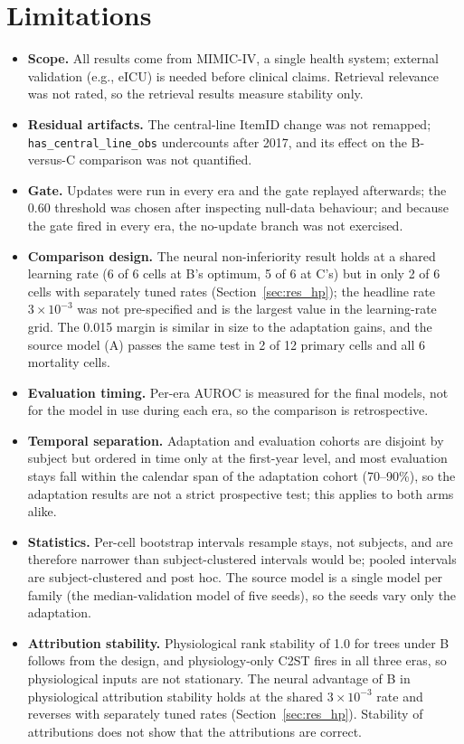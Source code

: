 \documentclass[10pt,a4paper,twocolumn]{article}
\begin{document}
	\section{Limitations}
	\label{sec:limitations}
	\begin{itemize}\setlength{\itemsep}{2pt}
		\item \textbf{Scope.} All results come from MIMIC-IV, a single health system; external validation (e.g., eICU) is needed before clinical claims. Retrieval relevance was not rated, so the retrieval results measure stability only.
		\item \textbf{Residual artifacts.} The central-line ItemID change was not remapped; \texttt{has\_central\_line\_obs} undercounts after 2017, and its effect on the B-versus-C comparison was not quantified.
		\item \textbf{Gate.} Updates were run in every era and the gate replayed afterwards; the 0.60 threshold was chosen after inspecting null-data behaviour; and because the gate fired in every era, the no-update branch was not exercised.
		\item \textbf{Comparison design.} The neural non-inferiority result holds at a shared learning rate (6 of 6 cells at B's optimum, 5 of 6 at C's) but in only 2 of 6 cells with separately tuned rates (Section~\ref{sec:res_hp}); the headline rate $3\times10^{-3}$ was not pre-specified and is the largest value in the learning-rate grid. The 0.015 margin is similar in size to the adaptation gains, and the source model (A) passes the same test in 2 of 12 primary cells and all 6 mortality cells.
		\item \textbf{Evaluation timing.} Per-era AUROC is measured for the final models, not for the model in use during each era, so the comparison is retrospective.
		\item \textbf{Temporal separation.} Adaptation and evaluation cohorts are disjoint by subject but ordered in time only at the first-year level, and most evaluation stays fall within the calendar span of the adaptation cohort (70--90\%), so the adaptation results are not a strict prospective test; this applies to both arms alike.
		\item \textbf{Statistics.} Per-cell bootstrap intervals resample stays, not subjects, and are therefore narrower than subject-clustered intervals would be; pooled intervals are subject-clustered and post hoc. The source model is a single model per family (the median-validation model of five seeds), so the seeds vary only the adaptation.
		\item \textbf{Attribution stability.} Physiological rank stability of 1.0 for trees under B follows from the design, and physiology-only C2ST fires in all three eras, so physiological inputs are not stationary. The neural advantage of B in physiological attribution stability holds at the shared $3\times10^{-3}$ rate and reverses with separately tuned rates (Section~\ref{sec:res_hp}). Stability of attributions does not show that the attributions are correct.
	\end{itemize}
	
\end{document}
